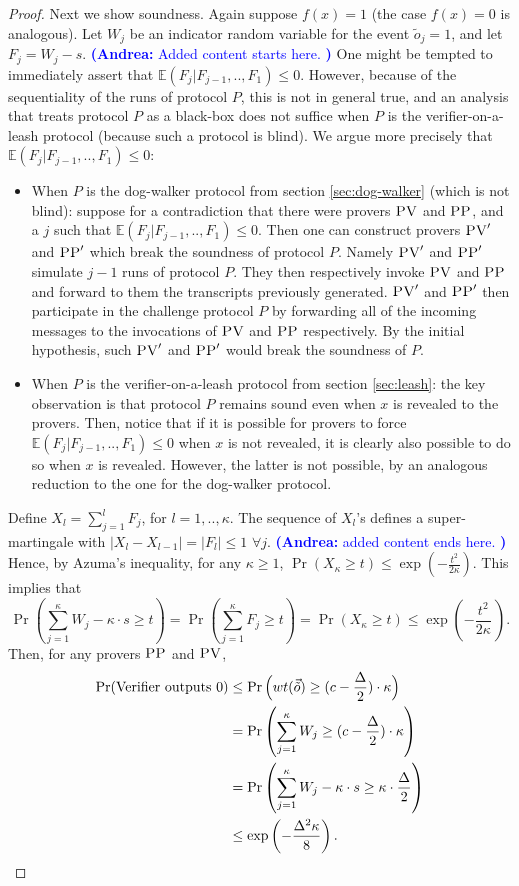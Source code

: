 \documentclass[11pt]{article}
\theoremstyle{remark}
\theoremstyle{definition}
\newcommand{\pv}{\textsc{PV}}
\newcommand{\pp}{\textsc{PP}}
\newcommand{\anote}[1]{\textcolor{blue}{\small {\textbf{(Andrea:} #1 \textbf{) }}}}
\begin{document}
\begin{proof}
Next we show soundness.
Again suppose $f(x) = 1$ (the case $f(x) = 0$ is analogous). Let $W_j$ be an indicator random variable for the event $\tilde{o}_j = 1$, and let $F_j = W_j - s$. \anote{Added content starts here.}One might be tempted to immediately assert that $\mathbb{E}(F_j|F_{j-1},..,F_1) \leq 0$. However, because of the sequentiality of the runs of protocol $P$, this is not in general true, and an analysis that treats protocol $P$ as a black-box does not suffice when $P$ is the verifier-on-a-leash protocol (because such a protocol is blind). We argue more precisely that $\mathbb{E}(F_j|F_{j-1},..,F_1) \leq 0$:
\begin{itemize}
    \item When $P$ is the dog-walker protocol from section \ref{sec:dog-walker} (which is not blind): suppose for a contradiction that there were provers $\pv$ and $\pp$, and a $j$ such that $\mathbb{E}(F_j|F_{j-1},..,F_1) \leq 0$. Then one can construct provers $\pv'$ and $\pp'$ which break the soundness of protocol $P$. Namely $\pv'$ and $\pp'$ simulate $j-1$ runs of protocol $P$. They then respectively invoke $\pv$ and $\pp$ and forward to them the transcripts previously generated. $\pv'$ and $\pp'$ then participate in the challenge protocol $P$ by forwarding all of the incoming messages to the invocations of $\pv$ and $\pp$ respectively. By the initial hypothesis, such $\pv'$ and $\pp'$ would break the soundness of $P$.
    \item When $P$ is the verifier-on-a-leash protocol from section \ref{sec:leash}: the key observation is that protocol $P$ remains sound even when $x$ is revealed to the provers. Then, notice that if it is possible for provers to force $\mathbb{E}(F_j|F_{j-1},..,F_1) \leq 0$ when $x$ is not revealed, it is clearly also possible to do so when $x$ is revealed. However, the latter is not possible, by an analogous reduction to the one for the dog-walker protocol. 
\end{itemize}
Define $X_l = \sum_{j=1}^l F_j$, for $l=1,..,\kappa$. The sequence of $X_l$'s defines a super-martingale with $|X_l-X_{l-1}| = |F_l| \leq 1 \,\, \forall j$. \anote{added content ends here.} Hence, by Azuma's inequality, for any $\kappa\geq 1$, $\Pr(X_\kappa \geq t) \leq \exp(-\frac{t^2}{2\kappa})$. This implies that 
\begin{equation*}
\Pr \left(\sum_{j=1}^{\kappa} W_j - \kappa \cdot s \geq t \right) = \Pr \left(\sum_{j=1}^{\kappa}F_j \geq t \right) = \Pr \left(X_{\kappa} \geq t \right) \leq \exp\left(-\frac{t^2}{2\kappa}\, \right).
\end{equation*}
Then, for any provers $\pp$ and $\pv$,
\begin{align*}
\Pr(\mbox{Verifier outputs $0$}) &\leq \Pr \Big(wt(\vec{\tilde{o}}) \geq (c - \frac{\Delta}{2})\cdot \kappa \Big) \\
&= \Pr \left(\sum_{j=1}^\kappa W_j \geq (c - \frac{\Delta}{2})\cdot \kappa \right) \\
&= \Pr \left(\sum_{j=1}^{\kappa} W_j - \kappa \cdot s \geq \kappa \cdot \frac{\Delta}{2} \right) \\
&\leq \exp \left(-\frac{\Delta^2\kappa}{8}\right). \qedhere
\end{align*}
\end{proof}
\end{document}
